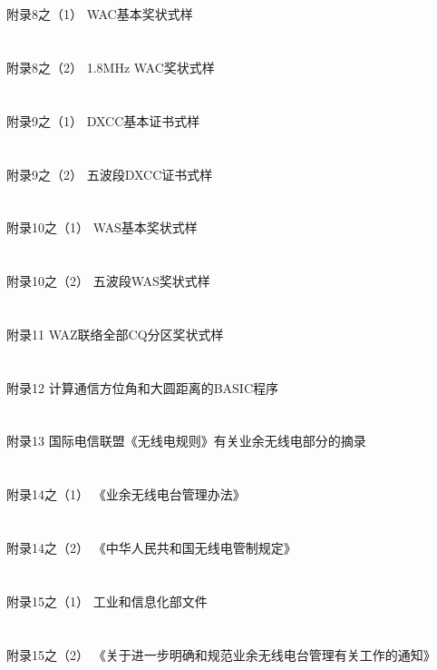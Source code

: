 \documentclass[12pt,UTF8]{ctexbook}
\begin{document}
\section{}附录8之（1） WAC基本奖状式样
\section{}附录8之（2） 1.8MHz WAC奖状式样
\section{}附录9之（1） DXCC基本证书式样
\section{}附录9之（2） 五波段DXCC证书式样
\section{}附录10之（1） WAS基本奖状式样
\section{}附录10之（2） 五波段WAS奖状式样
\section{}附录11 WAZ联络全部CQ分区奖状式样
\section{}附录12 计算通信方位角和大圆距离的BASIC程序
\section{}附录13 国际电信联盟《无线电规则》有关业余无线电部分的摘录
\section{}附录14之（1） 《业余无线电台管理办法》
\section{}附录14之（2） 《中华人民共和国无线电管制规定》
\section{}附录15之（1） 工业和信息化部文件
\section{}附录15之（2） 《关于进一步明确和规范业余无线电台管理有关工作的通知》
\end{document}
